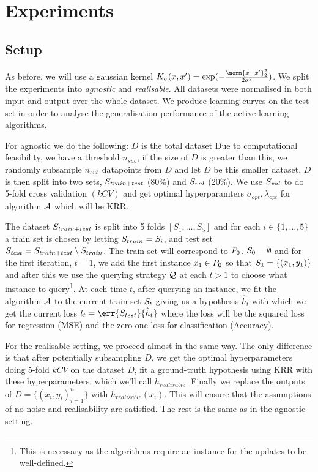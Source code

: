 \chapter{Experiments}
\label{ch:experiments}

\section{Setup}

As before, we will use a gaussian kernel \(K_{\sigma}(x, x') =
\exp(-\frac{\norm{x - x'}_2^2}{2\sigma^2})\). We split the experiments into
\textit{agnostic} and \textit{realisable}. All datasets were normalised in both
input and output over the whole dataset. We produce learning curves on the
test set in order to analyse the generalisation performance of the active
learning algorithms.

For agnostic we do the following: \(D\) is the total dataset Due
to computational feasibility, we have a threshold \(n_{sub}\), if the size of
\(D\) is greater than this, we randomly subsample \(n_{sub}\) datapoints from
\(D\) and let \(D\) be this smaller dataset. \(D\) is then split into two sets,
\(S_{train+test}\) (80\%) and \(S_{val}\) (20\%). We use
\(S_{val}\) to do 5-fold cross validation \((kCV)\) and get optimal
hyperparamters \(\sigma_{opt}, \lambda_{opt}\) for algorithm \(\mathcal{A}\) which will
be KRR.

The dataset \(S_{train+test}\) is split into 5 folds \([S_1, \dots,
S_5]\) and for each \(i \in \{1, \dots, 5\}\) a train set
is chosen by letting \(S_{train} = S_i\), and test set
\(S_{test} = S_{train+test} \setminus S_{train}\). The
train set will correspond to \(P_{0}\). \(S_{0} =
\emptyset\) and for the first iteration, \(t=1\), we add the first instance
\(x_{1} \in P_{0}\) so that \(S_{1} = \{(x_{1}, y_{1})\}\) and
after this we use the querying strategy \(\mathcal{Q}\) at each \(t > 1\) to
choose what instance to query\footnote{This is necessary as the algorithms
  require an instance for the updates to be well-defined.}. At each time \(t\),
after querying an instance, we fit the algorithm \(\mathcal{A}\) to the current train
set \(S_{t}\) giving us a hypothesis \(\hat{h}_{t}\) with which we get
the current loss \(l_{t} = \err{\trainset_{test}}{\hat{h}_{t}}\) where the loss
will be the squared loss for regression (MSE) and the zero-one loss for
classification (Accuracy).

For the realisable setting, we proceed almost in the same way. The only
difference is that after potentially subsampling \(D\), we get the optimal
hyperparameters doing 5-fold \(kCV\) on the dataset \(D\), fit a ground-truth
hypothesis using KRR with these hyperparameters, which we'll call
\(h_{realisable}\). Finally we replace the outputs of \(D = \{(x_i,
y_i)_{i=1}^n\}\) with \(h_{realisable}(x_i)\). This will ensure that the
assumptions of no noise and realisability are satisfied. The rest is the same as
in the agnostic setting.

